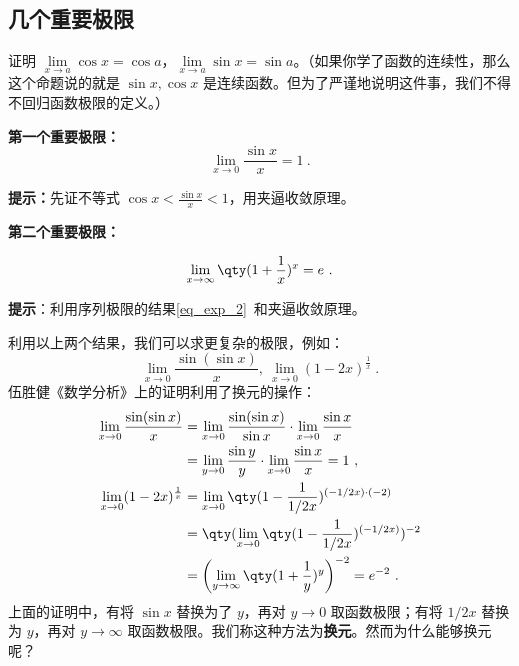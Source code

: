 \subsection{几个重要极限}
\begin{exercise}{}
证明 $\lim\limits_{x\rightarrow a}\cos x=\cos a$，$\lim\limits_{x\rightarrow a}\sin x=\sin a$。（如果你学了函数的连续性，那么这个命题说的就是 $\sin x,\cos x$ 是连续函数。但为了严谨地说明这件事，我们不得不回归函数极限的定义。）
\end{exercise}

\textbf{第一个重要极限：}
\begin{equation}
\lim\limits_{x\rightarrow 0}\frac{\sin x}{x}=1~.
\end{equation}

\textbf{提示：}先证不等式 $\cos x<\frac{\sin x}{x}<1$，用夹逼收敛原理。

\textbf{第二个重要极限：}

\begin{equation}
\lim\limits_{x\rightarrow \infty} \qty(1+\frac{1}{x})^x=e~.
\end{equation}

\textbf{提示}：利用序列极限的结果\autoref{eq_exp_2}~和夹逼收敛原理。

利用以上两个结果，我们可以求更复杂的极限，例如：
\begin{equation}
\lim\limits_{x\rightarrow 0}\frac{\sin(\sin x)}{x},\ \lim\limits_{x\rightarrow 0}(1-2x)^{\frac{1}{x}}~.
\end{equation}
伍胜健《数学分析》上的证明利用了换元的操作：
\begin{equation}
\begin{aligned}
\lim\limits_{x\rightarrow 0}\frac{\sin(\sin x)}{x}&=\lim\limits_{x\rightarrow 0}\frac{\sin(\sin x)}{\sin x}\cdot \lim\limits_{x\rightarrow 0}\frac{\sin x}{x}\\
&=\lim\limits_{y\rightarrow 0}\frac{\sin y}{y}\cdot \lim\limits_{x\rightarrow 0}\frac{\sin x}{x}=1~,\\
\lim\limits_{x\rightarrow 0}(1-2x)^{\frac{1}{x}}&=\lim\limits_{x\rightarrow 0}\qty(1-\frac{1}{1/2x})^{(-1/2x)\cdot (-2)}\\&=\qty(\lim\limits_{x\rightarrow 0}\qty(1-\frac{1}{1/2x})^{(-1/2x)})^{-2}
\\&=\left(\lim\limits_{y\rightarrow \infty}\qty(1+\frac{1}{y})^{y}\right)^{-2}=e^{-2}~.
\end{aligned}
\end{equation}
上面的证明中，有将 $\sin x$ 替换为了 $y$，再对 $y\rightarrow 0$ 取函数极限；有将 $1/2x$ 替换为 $y$，再对 $y\rightarrow \infty$ 取函数极限。我们称这种方法为\textbf{换元}。然而为什么能够换元呢？

